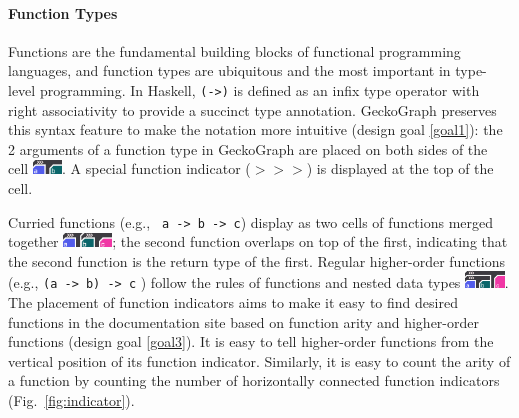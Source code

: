 \paragraph{Function Types}
Functions are the fundamental building blocks of functional programming languages, and function types are ubiquitous and the most important in type-level programming. In Haskell, \texttt{(->)} is defined as an infix type operator with right associativity to provide a succinct type annotation. GeckoGraph preserves this syntax feature to make the notation more intuitive (design goal \ref{goal1}): the 2 arguments of a function type in GeckoGraph are placed on both sides of the cell \includegraphics[height=1em]{figures/Function.png}. A special function indicator (\texttt{$>>>$}) is displayed at the top of the cell. 


Curried functions (e.g., \texttt{ a -> b -> c}) display as two cells of functions merged together \includegraphics[height=1em]{figures/Curry.png}; the second function overlaps on top of the first, indicating that the second function is the return type of the first. Regular higher-order functions (e.g., \texttt{(a -> b) -> c} ) follow the rules of functions and nested data types \includegraphics[height=1.2em]{figures/HOF.png}. The placement of function indicators aims to make it easy to find desired functions in the documentation site based on function arity and higher-order functions (design goal \ref{goal3}). It is easy to tell higher-order functions from the vertical position of its function indicator. Similarly, it is easy to count the arity of a function by counting the number of horizontally connected function indicators (Fig.~\ref{fig:indicator}). 


